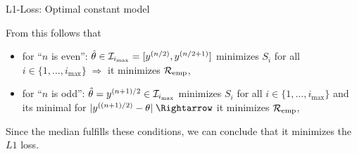 \documentclass[11pt,compress,t,notes=noshow, xcolor=table]{beamer}
\begin{document}
\begin{vbframe}{L1-Loss: Optimal constant model}
\begin{itemize}
  From this follows that
  \begin{itemize}
  \item for \enquote{$n$ is even}: $\hat{\theta} \in  \mathcal{I}_{i_{\max}} = [y^{(n/2)},y^{(n/2+1)}]$ minimizes $S_i$ for all $i \in \{1,\dots, i_{\max}\} \; \Rightarrow$  it minimizes $\mathcal{R}_{\text{emp}}$,
  \item for \enquote{$n$ is odd}: $\hat{\theta} = y^{(n+1)/2} \in \mathcal{I}_{i_{\max}}$ minimizes $S_i$ for all $i \in \{1,\dots, i_{\max}\}$ and its minimal for
  $|\yi[(n + 1)/2] - \theta| \; \Rightarrow$ it minimizes $\mathcal{R}_{\text{emp}}$,
  \end{itemize}

  Since the median fulfills these conditions, we can conclude that it minimizes 
  the $L1$ loss.
\end{itemize}








\framebreak 

\end{vbframe}






\endlecture
\end{document}
